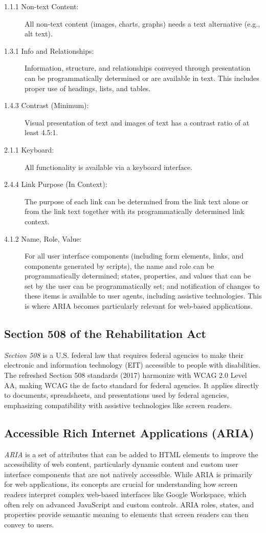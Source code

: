 \begin{description}
    \item[1.1.1 Non-text Content:] All non-text content (images, charts, graphs) needs a text alternative (e.g., alt text).
    \item[1.3.1 Info and Relationships:] Information, structure, and relationships conveyed through presentation can be programmatically determined or are available in text. This includes proper use of headings, lists, and tables.
    \item[1.4.3 Contrast (Minimum):] Visual presentation of text and images of text has a contrast ratio of at least 4.5:1.
    \item[2.1.1 Keyboard:] All functionality is available via a keyboard interface.
    \item[2.4.4 Link Purpose (In Context):] The purpose of each link can be determined from the link text alone or from the link text together with its programmatically determined link context.
    \item[4.1.2 Name, Role, Value:] For all user interface components (including form elements, links, and components generated by scripts), the name and role can be programmatically determined; states, properties, and values that can be set by the user can be programmatically set; and notification of changes to these items is available to user agents, including assistive technologies. This is where ARIA becomes particularly relevant for web-based applications.
\end{description}

\subsection{Section 508 of the Rehabilitation Act}
\label{subsec:section508}
\emph{Section 508} \cite{Section508} is a U.S. federal law that requires federal agencies to make their electronic and information technology (EIT) accessible to people with disabilities. The refreshed Section 508 standards (2017) harmonize with WCAG 2.0 Level AA, making WCAG the de facto standard for federal agencies. It applies directly to documents, spreadsheets, and presentations used by federal agencies, emphasizing compatibility with assistive technologies like screen readers.

\subsection{Accessible Rich Internet Applications (ARIA)}
\label{subsec:aria}
\emph{ARIA} \cite{ARIA} is a set of attributes that can be added to HTML elements to improve the accessibility of web content, particularly dynamic content and custom user interface components that are not natively accessible. While ARIA is primarily for web applications, its concepts are crucial for understanding how screen readers interpret complex web-based interfaces like Google Workspace, which often rely on advanced JavaScript and custom controls. ARIA roles, states, and properties provide semantic meaning to elements that screen readers can then convey to users.

